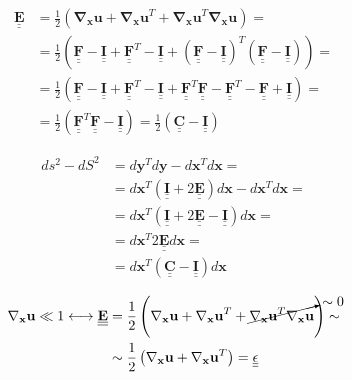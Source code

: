 \documentclass
[
a4paper,                      %
twoside,					  %
12pt,                         %
abstract,		      %
fleqn,                        %
]
{scrartcl} %
\begin{document}
\begin{equation}
\begin{aligned}
\mathbf{\underline{\underline{E}}}&=\frac{1}{2}\left(\mathbf{\nabla_{x}u}+\mathbf{\nabla_{x}u}^{T}+\mathbf{\nabla_{x}u}^{T}\mathbf{\nabla_{x}u}\right)=\\
&=\frac{1}{2}\left(\mathbf{\underline{\underline{F}}}-\mathbf{\underline{\underline{I}}}+\mathbf{\underline{\underline{F}}}^{T}-\mathbf{\underline{\underline{I}}}+\left(\mathbf{\underline{\underline{F}}}-\mathbf{\underline{\underline{I}}}\right)^{T}\left(\mathbf{\underline{\underline{F}}}-\mathbf{\underline{\underline{I}}}\right)\right)=\\
&=\frac{1}{2}\left(\mathbf{\underline{\underline{F}}}-\mathbf{\underline{\underline{I}}}+\mathbf{\underline{\underline{F}}}^{T}-\mathbf{\underline{\underline{I}}}+\mathbf{\underline{\underline{F}}}^{T}\mathbf{\underline{\underline{F}}}-\mathbf{\underline{\underline{F}}}^{T}-\mathbf{\underline{\underline{F}}}+\mathbf{\underline{\underline{I}}}\right)=\\
&=\frac{1}{2}\left(\mathbf{\underline{\underline{F}}}^{T}\mathbf{\underline{\underline{F}}}-\mathbf{\underline{\underline{I}}}\right)=\frac{1}{2}\left(\mathbf{\underline{\underline{C}}}-\mathbf{\underline{\underline{I}}}\right)
\end{aligned}
\end{equation}

\begin{equation}
\begin{aligned}
ds^{2}-dS^{2}&=d\mathbf{y}^{T}d\mathbf{y}-d\mathbf{x}^{T}d\mathbf{x}=\\
&=d\mathbf{x}^{T}\left(\mathbf{\underline{\underline{I}}}+2\mathbf{\underline{\underline{E}}}\right)d\mathbf{x}-d\mathbf{x}^{T}d\mathbf{x}=\\
&=d\mathbf{x}^{T}\left(\mathbf{\underline{\underline{I}}}+2\mathbf{\underline{\underline{E}}}-\mathbf{\underline{\underline{I}}}\right)d\mathbf{x}=\\
&=d\mathbf{x}^{T}2\mathbf{\underline{\underline{E}}}d\mathbf{x}=\\
&=d\mathbf{x}^{T}\left(\mathbf{\underline{\underline{C}}}-\mathbf{\underline{\underline{I}}}\right)d\mathbf{x}
\end{aligned}
\end{equation}

\begin{equation}
\begin{aligned}
\mathbf{\nabla_{x}u}\ll1\longleftrightarrow\mathbf{\underline{\underline{E}}}&=\frac{1}{2}\left(\mathbf{\nabla_{x}u}+\mathbf{\nabla_{x}u}^{T}+\cancelto{\sim0}{\mathbf{\nabla_{x}u}^{T}\mathbf{\nabla_{x}u}}\right)\sim\\
&\sim\frac{1}{2}\left(\mathbf{\nabla_{x}u}+\mathbf{\nabla_{x}u}^{T}\right)=\mathbf{\underline{\underline{\epsilon}}}
\end{aligned}
\end{equation}
\end{document}

